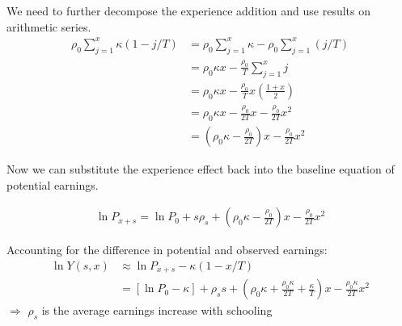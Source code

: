 \begin{frame}
We need to further decompose the experience addition and use results on arithmetic series.
\begin{align*}
\rho_0\sum_{j=1}^{x} \kappa \left(1 - j/T\right) & = \rho_0 \sum_{j=1}^{x} \kappa - \rho_0 \sum_{j=1}^{x} \left(j/T\right)\\
    & = \rho_0 \kappa x - \frac{\rho_0}{T} \sum_{j=1}^{x} j\\
    & = \rho_0 \kappa x - \frac{\rho_0}{T} x\left(\frac{1+x}{2}\right) \\
    & = \rho_0 \kappa x - \frac{\rho_0}{2T} x - \frac{\rho_0}{2T} x^2  \\
    & = \left(\rho_0 \kappa - \frac{\rho_0}{2T}\right) x - \frac{\rho_0}{2T} x^2
\end{align*}
\end{frame}
\begin{frame}
Now we can substitute the experience effect back into the baseline equation of potential earnings.

\begin{align*}
\ln{P_{x+s}} = \ln{P_0} + s \rho_s  + \left(\rho_0 \kappa - \frac{\rho_0}{2T}\right) x - \frac{\rho_0}{2T} x^2
\end{align*}
\end{frame}
\begin{frame}
Accounting for the difference in potential and observed earnings:
\begin{align*}
\ln{Y(s, x)} & \approx \ln{P_{x + s}} - \kappa\left(1 - x/T\right) \\
            & = [\ln{P_0} - \kappa] + \rho_s s + \left(\rho_0\kappa + \frac{\rho_0\kappa}{2T} + \frac{\kappa}{T}\right) x - \frac{\rho_0\kappa}{2T}x^2
\end{align*}
$\Rightarrow$ $\rho_s$ is the average earnings increase with schooling
\end{frame}
